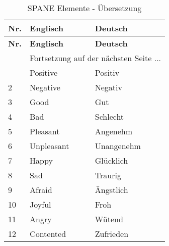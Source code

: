 \begin{RaggedRight}
\begin{center}
    \begin{longtable}[t]{|p{0.8 cm}|p{6.6 cm}|p{6.6 cm}|}
    \caption{SPANE Elemente - Übersetzung} \\ \hline
        \textbf{Nr.} & \textbf{Englisch} & \textbf{Deutsch} \\ \hline
        \endfirsthead
        \hline
        \textbf{Nr.} & \textbf{Englisch} & \textbf{Deutsch} \\ \hline
        \endhead 
        & \multicolumn{2}{|c|}{Fortsetzung auf der nächsten Seite $...$ } \\ \hline
        \endfoot
        \hline
        \endlastfoot
        1 & Positive & Positiv\\
        2 & Negative & Negativ\\
        3 & Good & Gut\\
        4 & Bad & Schlecht\\
        5 & Pleasant & Angenehm\\
        6 & Unpleasant & Unangenehm\\
        7 & Happy & Glücklich\\
        8 & Sad & Traurig\\
        9 & Afraid & Ängstlich\\
        10 & Joyful & Froh\\
        11 & Angry & Wütend\\
        12 & Contented & Zufrieden\\  
    \end{longtable}
	\label{tab:SpaneElemente}
\end{center}

\end{RaggedRight}
